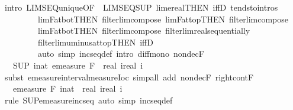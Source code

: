 \documentclass[leqno]{article}
\theoremstyle{definition}
\begin{document}
\begin{isabellebody}
\ {\isacharparenleft}intro\ LIMSEQ{\isacharunderscore}unique{\isacharbrackleft}OF\ {\isacharunderscore}\ LIMSEQ{\isacharunderscore}SUP{\isacharbrackright}\ lim{\isacharunderscore}ereal{\isacharbrackleft}THEN\ iffD{}{\isacharbrackright}\ tendsto{\isacharunderscore}intros\isanewline
\ \ \ \ \ \ \ \ \ lim{\isacharunderscore}F{\isacharunderscore}at{\isacharunderscore}bot{\isacharbrackleft}THEN\ filterlim{\isacharunderscore}compose{\isacharbrackright}\ lim{\isacharunderscore}F{\isacharunderscore}at{\isacharunderscore}top{\isacharbrackleft}THEN\ filterlim{\isacharunderscore}compose{\isacharbrackright}\isanewline
\ \ \ \ \ \ \ \ \ lim{\isacharunderscore}F{\isacharunderscore}at{\isacharunderscore}bot{\isacharbrackleft}THEN\ filterlim{\isacharunderscore}compose{\isacharbrackright}\ filterlim{\isacharunderscore}real{\isacharunderscore}sequentially\isanewline
\ \ \ \ \ \ \ \ \ filterlim{\isacharunderscore}uminus{\isacharunderscore}at{\isacharunderscore}top{\isacharbrackleft}THEN\ iffD{}{\isacharbrackright}{\isacharparenright}\isanewline
\ \ \ \ \ \ \ \ \ {\isacharparenleft}auto\ simp{\isacharcolon}\ incseq{\isacharunderscore}def\ intro{\isacharbang}{\isacharcolon}\ diff{\isacharunderscore}mono\ nondecF{\isacharparenright}\isanewline
\ \ \ \ \isamarkupfalse%
\ \isamarkupfalse%
\ {\isachardoublequoteopen}{\isasymdots}\ {\isacharequal}\ {\isacharparenleft}SUP\ i{\isacharcolon}{\isacharcolon}nat{\isachardot}\ emeasure\ {\isacharquery}F\ {\isacharbraceleft}{\isacharminus}\ real\ i{\isacharless}{\isachardot}{\isachardot}real\ i{\isacharbraceright}{\isacharparenright}{\isachardoublequoteclose}\isanewline
\ \ \ \ \ \ \isamarkupfalse%
\ {\isacharparenleft}subst\ emeasure{\isacharunderscore}interval{\isacharunderscore}measure{\isacharunderscore}Ioc{\isacharparenright}\ {\isacharparenleft}simp{\isacharunderscore}all\ add{\isacharcolon}\ nondecF\ right{\isacharunderscore}cont{\isacharunderscore}F{\isacharparenright}\isanewline
\ \ \ \ \isamarkupfalse%
\ \isamarkupfalse%
\ {\isachardoublequoteopen}{\isasymdots}\ {\isacharequal}\ emeasure\ {\isacharquery}F\ {\isacharparenleft}{\isasymUnion}i{\isacharcolon}{\isacharcolon}nat{\isachardot}\ {\isacharbraceleft}{\isacharminus}\ real\ i{\isacharless}{\isachardot}{\isachardot}real\ i{\isacharbraceright}{\isacharparenright}{\isachardoublequoteclose}\isanewline
\ \ \ \ \ \ \isamarkupfalse%
\ {\isacharparenleft}rule\ SUP{\isacharunderscore}emeasure{\isacharunderscore}incseq{\isacharparenright}\ {\isacharparenleft}auto\ simp{\isacharcolon}\ incseq{\isacharunderscore}def{\isacharparenright}\isanewline

\end{isabellebody}
\end{document}
